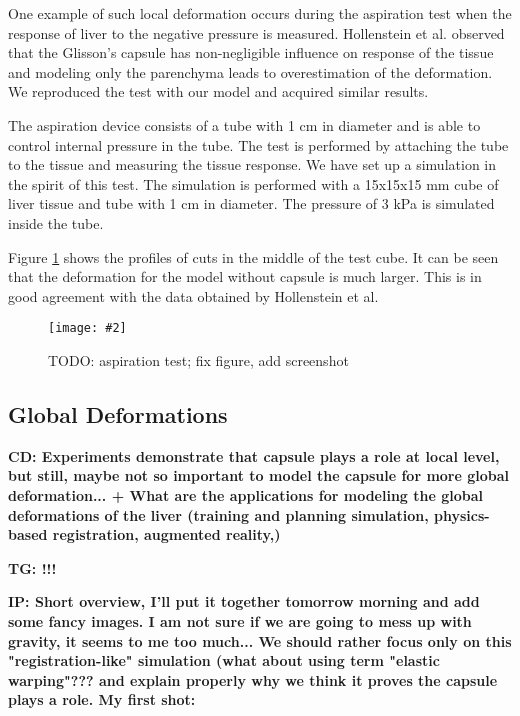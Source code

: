 \documentclass{llncs}
\newcommand{\TG}[1]{{\color{blue}\textbf{TG: #1}}}
\newcommand{\CD}[1]{{\color{green}\textbf{CD: #1}}}
\newcommand{\IP}[1]{{\color{cyan}\textbf{IP: #1}}}
\newcommand{\Figure}[3]{%
\begin{figure}[htb]
  \centering
  \texttt{[image: \#2]}
  \caption{\label{fig-#2}#3}
\end{figure}}
\begin{document}
One example of such local deformation occurs during the aspiration test
when the response of liver to the negative pressure is measured.
Hollenstein et al. \cite{Hollenstein2006} observed that the Glisson's
capsule has non-negligible influence on response of the tissue and modeling
only the parenchyma leads to overestimation of the deformation. We
reproduced the test with our model and acquired similar results.

The aspiration device consists of a tube with 1 cm in diameter and is able
to control internal pressure in the tube. The test is performed by
attaching the tube to the tissue and measuring the tissue response. We
have set up a simulation in the spirit of this test. 
The simulation is performed with a 15x15x15 mm cube of liver tissue and tube
with 1 cm in diameter. The pressure of 3 kPa is simulated inside the tube.

Figure \ref{fig-aspiration} shows the profiles of cuts in the middle of the
test cube. It can be seen that the
deformation for the model without capsule is much larger. This is in good
agreement with the data obtained by Hollenstein et al.

\Figure{4in}{aspiration}{TODO: aspiration test; fix figure, add screenshot}





\subsection{Global Deformations}
\CD{ Experiments demonstrate that capsule plays a role at local level, but still, maybe not so important to model the capsule for more global deformation...
+ What are the applications for modeling the global deformations of the liver (training and planning simulation, physics-based registration, augmented reality,)}


\TG{!!!}


\IP{Short overview, I'll put it together tomorrow morning and add some fancy images. I am not sure if we are going to mess up 
with gravity, it seems to me too much... We should rather focus only on this "registration-like" simulation (what about 
using term "elastic warping"??? and explain properly why we think it proves the capsule plays a role. My first shot:}
\end{document}
